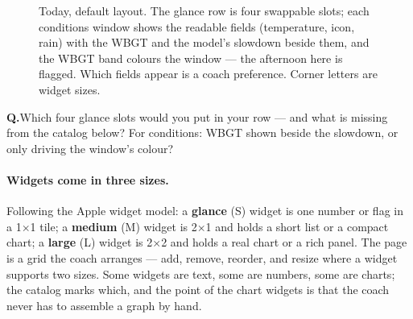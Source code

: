 \documentclass[11pt]{article}
\newcommand{\question}[1]{\par\vspace{4pt}%
  \noindent\colorbox{kailosoft}{\parbox{\dimexpr\linewidth-2\fboxsep}{%
  \small\textcolor{kailoaccent}{\textbf{Q.}}\;#1}}\par\vspace{3pt}}
\begin{document}
\begin{figure}[H]
\caption{Today, default layout. The glance row is four swappable slots; each
conditions window shows the readable fields (temperature, icon, rain) with
the WBGT and the model's slowdown beside them, and the WBGT band colours the
window --- the afternoon here is flagged. Which fields appear is a coach
preference. Corner letters are widget sizes.}
\label{fig:todaywire}
\end{figure}

\question{Which four glance slots would you put in your row --- and what is
missing from the catalog below? For conditions: WBGT shown beside the
slowdown, or only driving the window's colour?}

\paragraph{Widgets come in three sizes.} Following the Apple widget model: a
\textbf{glance} (S) widget is one number or flag in a 1$\times$1 tile; a
\textbf{medium} (M) widget is 2$\times$1 and holds a short list or a compact
chart; a \textbf{large} (L) widget is 2$\times$2 and holds a real chart or a
rich panel. The page is a grid the coach arranges --- add, remove, reorder,
and resize where a widget supports two sizes. Some widgets are text, some
are numbers, some are charts; the catalog marks which, and the point of the
chart widgets is that the coach never has to assemble a graph by hand.
\end{document}
